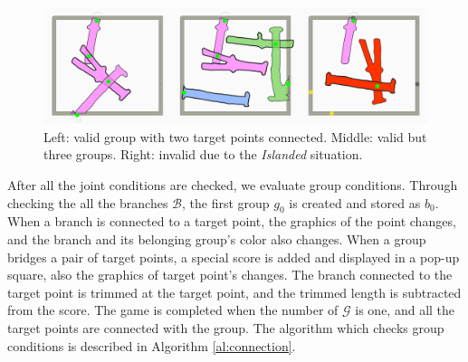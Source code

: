 \begin{figure}[ht]
  \begin{center}
    \includegraphics[width = 0.4\paperwidth]{images/interface/groups.jpg}
    \caption{Left: valid group with two target points connected. Middle: valid but three groups. Right: invalid due to the \textit{Islanded} situation. }
    \label{fig:group}
  \end{center}
\end{figure}


After all the joint conditions are checked, we evaluate group conditions.
Through checking the all the branches $\mathcal{B}$, the first group $g_0$ is created and stored as $b_0$.
When a branch is connected to a target point, the graphics of the point changes, and the branch and its belonging group's color also changes.
When a group bridges a pair of target points, a special score is added and displayed in a pop-up square, also the graphics of target point's changes.
The branch connected to the target point is trimmed at the target point, and the trimmed length is subtracted from the score.
The game is completed when the number of $\mathcal{G}$ is one, and all the target points are connected with the group.
The algorithm which checks group conditions is described in Algorithm \ref{al:connection}.

